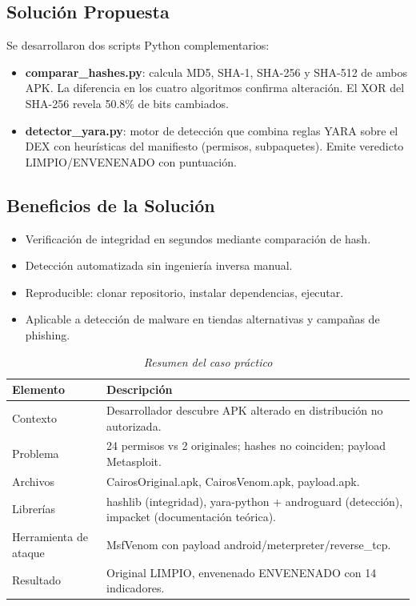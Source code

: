 \documentclass[12pt,a4paper]{article}
\begin{document}
\subsection{Solución Propuesta}

Se desarrollaron dos scripts Python complementarios:

\begin{itemize}
\item \textbf{comparar\_hashes.py}: calcula MD5, SHA-1, SHA-256 y SHA-512 de
  ambos APK. La diferencia en los cuatro algoritmos confirma alteración.
  El XOR del SHA-256 revela 50.8\% de bits cambiados.

\item \textbf{detector\_yara.py}: motor de detección que combina reglas
  YARA sobre el DEX con heurísticas del manifiesto (permisos,
  subpaquetes). Emite veredicto LIMPIO/ENVENENADO con puntuación.
\end{itemize}

\subsection{Beneficios de la Solución}

\begin{itemize}
\item Verificación de integridad en segundos mediante comparación de hash.
\item Detección automatizada sin ingeniería inversa manual.
\item Reproducible: clonar repositorio, instalar dependencias, ejecutar.
\item Aplicable a detección de malware en tiendas alternativas y campañas de phishing.
\end{itemize}

\begin{table}[H]
\centering
\begin{threeparttable}
\caption{\textit{Resumen del caso práctico}}
\begin{tabular}{p{4cm}p{9cm}}
\toprule
\textbf{Elemento} & \textbf{Descripción} \\
\midrule
Contexto & Desarrollador descubre APK alterado en distribución no autorizada. \\
Problema & 24 permisos vs 2 originales; hashes no coinciden; payload Metasploit. \\
Archivos & CairosOriginal.apk, CairosVenom.apk, payload.apk. \\
Librerías & hashlib (integridad), yara-python + androguard (detección), impacket (documentación teórica). \\
Herramienta de ataque & MsfVenom con payload android/meterpreter/reverse\_tcp. \\
Resultado & Original LIMPIO, envenenado ENVENENADO con 14 indicadores. \\
\bottomrule
\end{tabular}
\end{threeparttable}
\end{table}
\end{document}
